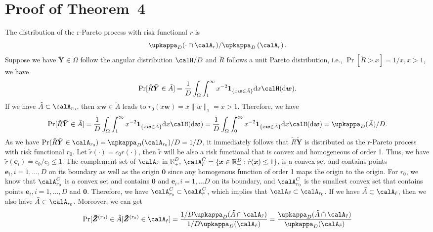\documentclass[12pt]{article}
\begin{document}
\section{Proof of Theorem~4}
    The distribution of the r-Pareto process with risk functional $r$ is 
    $$\upkappa_D(\cdot\cap \calA_r )/\upkappa_D\left(\calA_r\right).$$ 
    Suppose we have $\bm{\tilde Y}\in\Omega$ follow the angular distribution $\calH/D$ and $\tilde R$ follows a unit Pareto distribution, i.e., $\Pr[\tilde R>x]=1/x, x>1$, we have
    $$\Pr[\tilde R\bm{\tilde Y}\in \tilde A] = \frac{1}{D}\int_{\Omega}\int_{1}^{\infty} x^{-2}\bm 1_{\{x\bm w\in \tilde A\}}\text dx\calH(\text d\bm w).$$
    If we have $\tilde A\subset\calA_{r_0}$, then $x\bm w\in\tilde A$ leads to $r_0(x\bm w)=x\|w\|_1=x >1$. Therefore, we have 
    $$\Pr[\tilde R\bm{\tilde Y}\in \tilde A] = \frac{1}{D}\int_{\Omega}\int_{1}^{\infty} x^{-2}\bm 1_{\{x\bm w\in \tilde A\}}\text dx\calH(\text d\bm w) = \frac{1}{D}\int_{\Omega}\int_{0}^{\infty} x^{-2}\bm 1_{\{x\bm w\in \tilde A\}}\text dx\calH(\text d\bm w) = \upkappa_D(\tilde A)/D.$$ 
    As we have $\Pr( \tilde R\tilde {\bm Y} \in \calA_{r_0}) = \upkappa_D(\calA_{r_0})/D=1/D$, it immediately follows that $\tilde R\bm {\tilde Y}$ is distributed as the r-Pareto process with risk functional $r_0$. Let $\tilde r(\cdot) = c_0 r(\cdot)$, then $\tilde r$ will be also a risk functional that is convex and homogeneous of order 1. Thus, we have $\tilde r(\bm e_i)=c_0/c_i\leq 1$. The complement set of $\calA_{\tilde r}$ in $\mathbb R_+^D$, $\calA_{\tilde r}^C=\{\bm x\in\mathbb R_+^D: \tilde r(\bm x)\leq 1\}$, is a convex set and contains points $\bm e_i, i=1,\dots,D$ on its boundary as well as the origin $\bm 0$ since any homogenous function of order 1 maps the origin to the origin. For $r_0$, we know that $\calA_{r_0}^C$ is a convex set and contains $\bm 0$ and $\bm e_i,i=1,\dots D$ on its boundary, and $\calA_{r_0}^C$ is the smallest convex set that contains points $\bm e_i,i=1,\dots,D$ and $\bm 0$. Therefore, we have $\calA_{r_0}^C\subset \calA_{\tilde r}^C$, which implies that $\calA_{\tilde r} \subset \calA_{r_0}$. If we have $\tilde A\subset\calA_{\tilde r}$, then we also have  $\tilde A\subset\calA_{r_0}$. Moreover, we can get
    \begin{equation}
        \Pr[\bm{\tilde Z}^{(r_0)}\in \tilde A | \bm{\tilde Z}^{(r_0)} \in \calA_{\tilde r} ] = \frac{1/D\upkappa_D(\tilde A\cap \calA_{\tilde r})}{1/D\upkappa_D(\calA_{\tilde r})} = \frac{\upkappa_D(\tilde A \cap \calA_{\tilde r})}{\upkappa_D(\calA_{\tilde r})}
    \end{equation}
\end{document}
